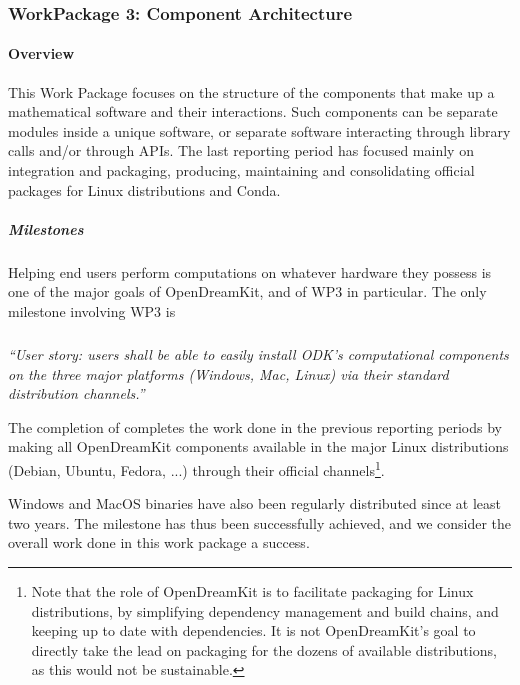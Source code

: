 \subsubsection{WorkPackage 3:  Component Architecture}

\paragraph{Overview}

This Work Package focuses on the structure of the components that make
up a mathematical software and their interactions. Such components can
be separate modules inside a unique software, or separate software
interacting through library calls and/or through APIs.
%
The last reporting period has focused mainly on integration and
packaging, producing, maintaining and consolidating official packages
for Linux distributions and Conda.

\subparagraph{Milestones} Helping end users perform computations on
whatever hardware they possess is one of the major goals of
OpenDreamKit, and of WP3 in particular. The only milestone involving
WP3 is

\subparagraph{}

\emph{“User story: users shall be able to easily install ODK's
    computational components on the three major platforms (Windows,
    Mac, Linux) via their standard distribution channels.”}

  The completion of
   completes
  the work done in the previous reporting periods by making all
  OpenDreamKit components available in the major Linux distributions
  (Debian, Ubuntu, Fedora, ...) through their official
  channels\footnote{Note that the role of OpenDreamKit is to
    facilitate packaging for Linux distributions, by simplifying
    dependency management and build chains, and keeping up to date
    with dependencies. It is not OpenDreamKit's goal to directly take
    the lead on packaging for the dozens of available distributions,
    as this would not be sustainable.}.

  Windows and MacOS binaries have also been regularly distributed
  since at least two years. The milestone has thus been successfully
  achieved, and we consider the overall work done in this work package
  a success.
  
